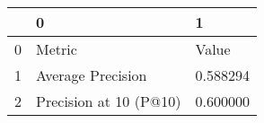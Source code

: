 \begin{tabular}{lll}
\toprule
 & 0 & 1 \\
\midrule
0 & Metric & Value \\
1 & Average Precision & 0.588294 \\
2 & Precision at 10 (P@10) & 0.600000 \\
\bottomrule
\end{tabular}
